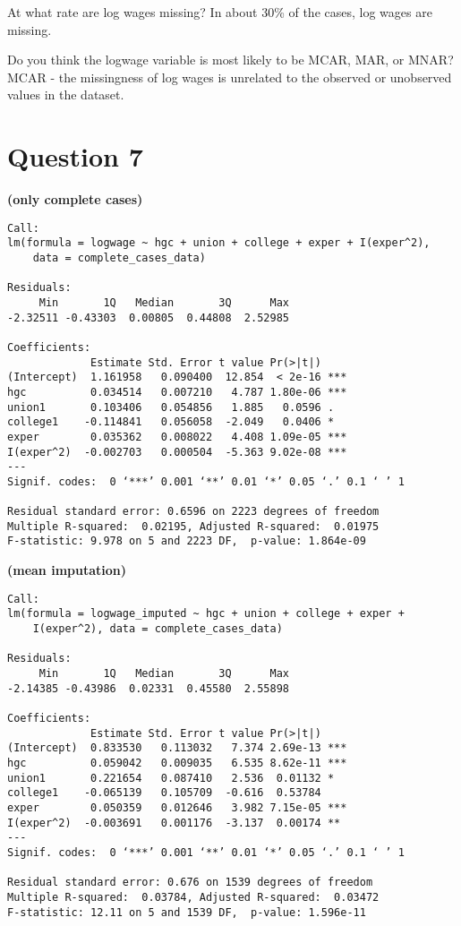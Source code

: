 \documentclass{article}
\begin{document}
At what rate are log wages missing? In about 30\% of the cases, log wages are missing.

Do you think the logwage variable is most likely to be MCAR, MAR, or MNAR? MCAR - the missingness of log wages is unrelated to the observed or unobserved values in the dataset.

\section*{Question 7}

\textbf{(only complete cases)}
\begin{verbatim}
Call:
lm(formula = logwage ~ hgc + union + college + exper + I(exper^2), 
    data = complete_cases_data)

Residuals:
     Min       1Q   Median       3Q      Max 
-2.32511 -0.43303  0.00805  0.44808  2.52985 

Coefficients:
             Estimate Std. Error t value Pr(>|t|)    
(Intercept)  1.161958   0.090400  12.854  < 2e-16 ***
hgc          0.034514   0.007210   4.787 1.80e-06 ***
union1       0.103406   0.054856   1.885   0.0596 .  
college1    -0.114841   0.056058  -2.049   0.0406 *  
exper        0.035362   0.008022   4.408 1.09e-05 ***
I(exper^2)  -0.002703   0.000504  -5.363 9.02e-08 ***
---
Signif. codes:  0 ‘***’ 0.001 ‘**’ 0.01 ‘*’ 0.05 ‘.’ 0.1 ‘ ’ 1

Residual standard error: 0.6596 on 2223 degrees of freedom
Multiple R-squared:  0.02195, Adjusted R-squared:  0.01975 
F-statistic: 9.978 on 5 and 2223 DF,  p-value: 1.864e-09
\end{verbatim}

\textbf{(mean imputation)}
\begin{verbatim}
Call:
lm(formula = logwage_imputed ~ hgc + union + college + exper + 
    I(exper^2), data = complete_cases_data)

Residuals:
     Min       1Q   Median       3Q      Max 
-2.14385 -0.43986  0.02331  0.45580  2.55898 

Coefficients:
             Estimate Std. Error t value Pr(>|t|)    
(Intercept)  0.833530   0.113032   7.374 2.69e-13 ***
hgc          0.059042   0.009035   6.535 8.62e-11 ***
union1       0.221654   0.087410   2.536  0.01132 *  
college1    -0.065139   0.105709  -0.616  0.53784    
exper        0.050359   0.012646   3.982 7.15e-05 ***
I(exper^2)  -0.003691   0.001176  -3.137  0.00174 ** 
---
Signif. codes:  0 ‘***’ 0.001 ‘**’ 0.01 ‘*’ 0.05 ‘.’ 0.1 ‘ ’ 1

Residual standard error: 0.676 on 1539 degrees of freedom
Multiple R-squared:  0.03784, Adjusted R-squared:  0.03472 
F-statistic: 12.11 on 5 and 1539 DF,  p-value: 1.596e-11
\end{verbatim}
\end{document}
